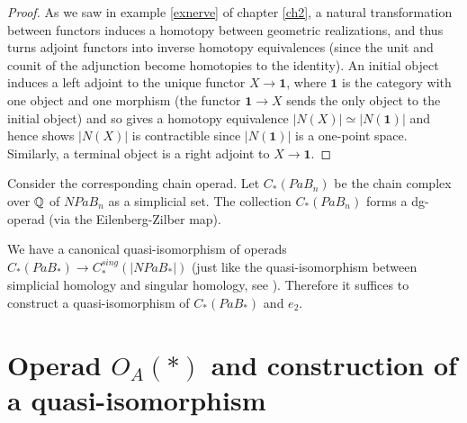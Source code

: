 \documentclass[TFM.tex]{subfiles}
\begin{document}
\begin{proof}
	As we saw in example \ref{exnerve} of chapter \ref{ch2}, a natural transformation between functors induces a homotopy between geometric realizations, and thus turns adjoint functors into inverse homotopy equivalences (since the unit and counit of the adjunction become homotopies to the identity). An initial object induces a left adjoint to the unique functor $X→\mathbf{1}$, where $\mathbf{1}$ is the category with one object and one morphism (the functor $\mathbf{1}\to X$ sends the only object to the initial object) and so gives a homotopy equivalence $|N(X)|\simeq|N(\mathbf{1})|$ and hence shows $|N(X)|$ is contractible since $|N(\mathbf{1})|$ is a one-point space. Similarly, a terminal object is a right adjoint to $X→\mathbf{1}$. %
\end{proof}

Consider the corresponding chain operad. Let $C_*(PaB_n)$ be the chain complex over $\mathbb{Q}$ of $NPaB_n$ as a simplicial set. The collection $C_*(PaB_n)$ forms a dg-operad (via the Eilenberg-Zilber map). 

We have a canonical quasi-isomorphism of operads $C_*(PaB_*)\to C_*^{sing}(|NPaB_*|)$ (just like the quasi-isomorphism between simplicial homology and singular homology, see \cite[]{Hatcher}). Therefore it suffices to construct a quasi-isomorphism of $C_*(PaB_*)$ and $e_2$.

\section{Operad $O_A(*)$ and construction of a quasi-isomorphism}
\end{document}
